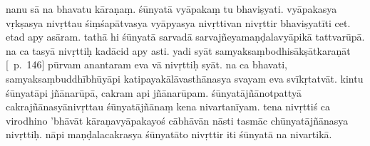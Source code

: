 \documentclass[12pt]{article}
\begin{document}
% 

nanu sā na\footnoteB{
	na] \EDD\ (\emd); deest \emph{in} \MS
} bhavatu kāraṇaṃ. śūnyatā vyāpakaṃ tu bhaviṣyati. vyāpakasya vṛkṣasya nivṛttau śiṃśapātvasya vyāpyasya nivṛttivan nivṛttir bhaviṣyatīti cet. etad apy asāram. tathā hi śūnyatā sarvadā sarvajñeyamaṇḍalavyāpikā tattvarūpā.\footnoteB{
	tattvarūpā] \EDD ; tatvarūpāḥ \MS
} na ca tasyā nivṛttiḥ kadācid apy asti. yadi syāt samyaksaṃbodhisākṣātkaraṇāt [\EDD\ p.\ 146] pūrvam anantaram eva vā nivṛttiḥ syāt. na ca bhavati, samyaksaṃbuddhībhūyāpi katipayakālāvasthānasya svayam eva svīkṛtatvāt. kintu śūnyatāpi jñānarūpā, cakram api jñānarūpam. śūnyatājñānotpattyā cakrajñānasyānivṛttau śūnyatājñānaṃ kena nivartanīyam. tena nivṛttiś ca virodhino 'bhāvāt kāraṇavyāpakayoś cābhāvān nāsti tasmāc chūnyatājñānasya nivṛttiḥ. nāpi maṇḍalacakrasya śūnyatāto nivṛttir iti śūnyatā na nivartikā.
\end{document}
